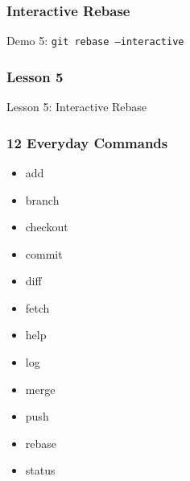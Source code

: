 \begin{frame}
    \frametitle{Interactive Rebase}
    \alert{Demo 5}: \texttt{git rebase --interactive}
\end{frame}

\begin{frame}
    \frametitle{Lesson 5}
    \alert{Lesson 5}: Interactive Rebase
\end{frame}

\begin{frame}
    \frametitle{12 Everyday Commands}
    \begin{multicols}{3}
        \begin{itemize}
            \setlength\itemsep{3em}
            \item \alert{add}
            \item \alert{branch}
            \item \alert{checkout}
            \item \alert{commit}
            \item \alert{diff}
            \item fetch
            \item \alert{help}
            \item \alert{log}
            \item \alert{merge}
            \item push
            \item \alert{rebase}
            \item \alert{status}
        \end{itemize}
    \end{multicols}
\end{frame}
